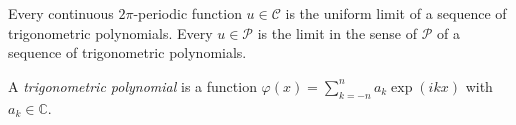 Every continuous $2\pi$-periodic function $u \in \mathcal{C}$ is the uniform limit of a sequence of trigonometric polynomials. Every $u \in \mathcal{P}$ is the limit in the sense of $\mathcal{P}$ of a sequence of trigonometric polynomials.

A \textit{trigonometric polynomial} is a function $\varphi(x) = \sum_{k=-n}^{n} a_k \exp(ikx)$ with $a_k \in \mathbb{C}$.
